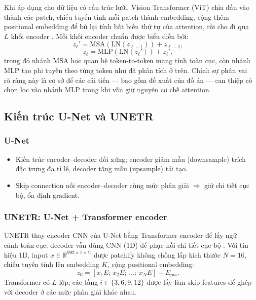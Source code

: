 \documentclass[../DoAn.tex]{subfiles}
\begin{document}
Khi áp dụng cho dữ liệu có cấu trúc lưới, Vision Transformer (ViT) chia đầu vào thành
các patch, chiếu tuyến tính mỗi patch thành embedding, cộng thêm positional embedding để
bù lại tính bất biến thứ tự của attention, rồi cho đi qua $L$ khối encoder
\cite{dosovitskiyImageWorth16x162021}. Mỗi khối encoder chuẩn được biểu diễn bởi:
\begin{equation}
  z_\ell' = \mathrm{MSA}(\mathrm{LN}(z_{\ell-1})) + z_{\ell-1},
\end{equation}
\begin{equation}
  z_\ell = \mathrm{MLP}(\mathrm{LN}(z_\ell')) + z_\ell',
\end{equation}
trong đó nhánh MSA học quan hệ token-to-token mang tính toàn cục, còn nhánh MLP tạo phi
tuyến theo từng token như đã phân tích ở trên. Chính sự phân vai rõ ràng này là cơ sở
để các cải tiến --- bao gồm đề xuất của đồ án --- can thiệp có chọn lọc vào nhánh MLP
trong khi vẫn giữ nguyên cơ chế attention.

\subsection{Kiến trúc U-Net và UNETR}

\subsubsection{U-Net}
\begin{itemize}
  \item Kiến trúc encoder--decoder đối xứng; encoder giảm mẫu (downsample) trích đặc trưng đa tỉ lệ, decoder tăng mẫu (upsample) tái tạo.
  \item Skip connection nối encoder--decoder cùng mức phân giải $\Rightarrow$ giữ chi tiết cục bộ, ổn định gradient.
\end{itemize}

\subsubsection{UNETR: U-Net + Transformer encoder}
UNETR thay encoder CNN của U-Net bằng Transformer encoder để lấy ngữ cảnh toàn cục; decoder vẫn dùng CNN (1D) để phục hồi chi tiết cục bộ \cite{hatamizadehUNETRTransformers3D2021}.
Với tín hiệu 1D, input $x\in\mathbb{R}^{992\times 1\times C}$ được patchify không chồng lấp kích thước $N=16$,
chiếu tuyến tính lên embedding $K$, cộng positional embedding:
\begin{equation}
  z_0 = [x_1E;\,x_2E;\,\ldots;\,x_NE] + E_{pos}.
\end{equation}
Transformer có $L$ lớp; các tầng $i\in\{3,6,9,12\}$ được lấy làm skip features để ghép với decoder ở các mức phân giải khác nhau.
\end{document}
